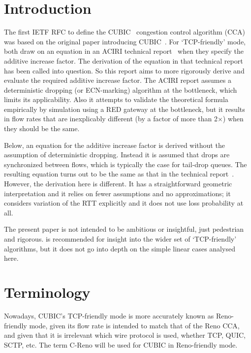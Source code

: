 \section{Introduction}\label{Introduction}

The first IETF RFC to define the CUBIC~\cite{Rhee18:Cubic_RFC} congestion control algorithm (CCA) was based on the original paper introducing CUBIC~\cite{Ha08:cubic}. For `TCP-friendly' mode, both draw on an equation in an ACIRI technical report~\cite{Floyd00:Eqn_v_AIMD_cc} when they specify the additive increase factor. The derivation of the equation in that technical report has been called into question. So this report aims to more rigorously derive and evaluate the required additive increase factor. The ACIRI report assumes a deterministic dropping (or ECN-marking) algorithm at the bottleneck, which limits its applicability. Also it attempts to validate the theoretical formula empirically by simulation using a RED gateway at the bottleneck, but it results in flow rates that are inexplicably different (by a factor of more than 2\(\times\)) when they should be the same.

Below, an equation for the additive increase factor is derived without the assumption of deterministic dropping. Instead it is assumed that drops are synchronized between flows, which is typically the case for tail-drop queues. The resulting equation turns out to be the same as that in the technical report~\cite{Floyd00:Eqn_v_AIMD_cc}. However, the derivation here is different. It has a straightforward geometric interpretation and it relies on fewer assumptions and no approximations; it considers variation of the RTT explicitly and it does not use loss probability at all.

The present paper is not intended to be ambitious or insightful, just pedestrian and rigorous. \cite{Bansal01:Binom_cc} is recommended for insight into the wider set of `TCP-friendly' algorithms, but it does not go into depth on the simple linear cases analysed here.

\section{Terminology}\label{Terminology}

Nowadays, CUBIC's TCP-friendly mode is more accurately known as Reno-friendly mode, given its flow rate is intended to match that of the Reno CCA, and given that it is irrelevant which wire protocol is used, whether TCP, QUIC, SCTP, etc. The term C-Reno will be used for CUBIC in Reno-friendly mode.

